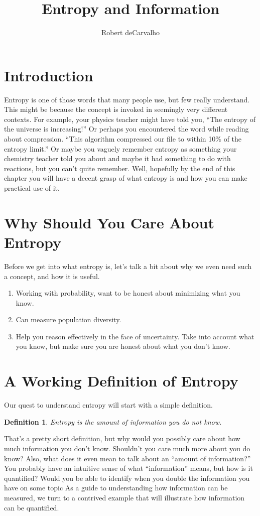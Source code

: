 \documentclass[11pt, oneside]{article}   	%
\title{Entropy and Information}
\author{Robert deCarvalho}
\date{}							%
\newtheorem{definition}{Definition}
\begin{document}
\maketitle


\section{Introduction}
Entropy is one of those words that many people use, but few really understand.
This might be because the concept is invoked in seemingly very different
contexts.  For example, your physics teacher might have told you, ``The entropy
of the universe is increasing!'' Or perhaps you encountered the word while
reading about compression. ``This algorithm compressed our file to within
10\% of the entropy limit.''  Or maybe you vaguely remember entropy as something
your chemistry teacher told you about and maybe it had something to do with
reactions, but you can't quite remember.  Well, hopefully by the end of this
chapter you will have a decent grasp of what entropy is and how you can make
practical use of it.

\section{Why Should You Care About Entropy}
Before we get into what entropy is, let's talk a bit about why we even need such
a concept, and how it is useful.
\begin{enumerate}
    \item Working with probability, want to be honest about minimizing what you
        know.
    \item Can measure population diversity.
    \item Help you reason effectively in the face of uncertainty.  Take into
        account what you know, but make sure you are honest about what you don't
        know.
\end{enumerate}


\section{A Working Definition of Entropy}
Our quest to understand entropy will start with a simple definition.
\begin{definition}
    Entropy is the amount of information you do not know.
\end{definition}
That's a pretty short definition, but why would you possibly care about how much
information you don't know.  Shouldn't you care much more about you do know?
Also, what does it even mean to talk about an ``amount of information?'' You
probably have an intuitive sense of what ``information'' means, but how is it
quantified?  Would you be able to identify when you double the information you
have on some topic As a guide to understanding how information can be measured,
we turn to a contrived example that will illustrate how information can be
quantified.
\end{document}
